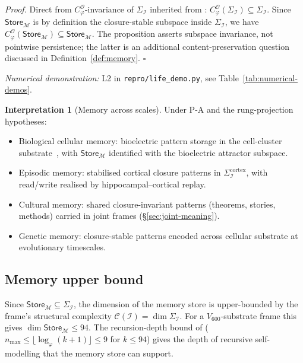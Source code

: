 \documentclass[11pt]{article}
\theoremstyle{plain}
\theoremstyle{definition}
\newtheorem{interpretation}[theorem]{Interpretation}
\theoremstyle{remark}
\newcommand{\Ical}{\mathcal{I}}
\newcommand{\Ocal}{\mathcal{O}}
\newcommand{\Ccal}{\mathcal{C}}
\newcommand{\Mcal}{\mathcal{M}}
\newcommand{\Cph}{C_\varphi}
\begin{document}
\noindent\emph{Proof.} Direct from $\Cph^\Ocal$-invariance of $\Sigma_\Ical$ inherited from \citet{SmartExistenceClosure}: $\Cph^\Ocal(\Sigma_\Ical) \subseteq \Sigma_\Ical$. Since $\mathsf{Store}_\Mcal$ is by definition the closure-stable subspace inside $\Sigma_\Ical$, we have $\Cph^\Ocal(\mathsf{Store}_\Mcal) \subseteq \mathsf{Store}_\Mcal$. The proposition asserts subspace invariance, not pointwise persistence; the latter is an additional content-preservation question discussed in Definition~\ref{def:memory}. \hfill$\square$

\noindent\emph{Numerical demonstration:} L2 in \texttt{repro/life\_demo.py}, see Table~\ref{tab:numerical-demos}.


\begin{interpretation}[Memory across scales]\label{int:memory}
Under P-A and the rung-projection hypotheses:
\begin{itemize}[leftmargin=2em]
\item Biological cellular memory: bioelectric pattern storage in the cell-cluster substrate~\citep{LevinBasalCognition}, with $\mathsf{Store}_\Mcal$ identified with the bioelectric attractor subspace.
\item Episodic memory: stabilised cortical closure patterns in $\Sigma_\Ical^{\mathrm{cortex}}$, with read/write realised by hippocampal--cortical replay.
\item Cultural memory: shared closure-invariant patterns (theorems, stories, methods) carried in joint frames (\S\ref{sec:joint-meaning}).
\item Genetic memory: closure-stable patterns encoded across cellular substrate at evolutionary timescales.
\end{itemize}
\end{interpretation}

\subsection{Memory upper bound}

Since $\mathsf{Store}_\Mcal \subseteq \Sigma_\Ical$, the dimension of the memory store is upper-bounded by the frame's structural complexity $\Ccal(\Ical) = \dim \Sigma_\Ical$. For a $V_{600}$-substrate frame this gives $\dim \mathsf{Store}_\Mcal \leq 94$. The recursion-depth bound of \citet{SmartExistenceClosure} ($n_{\max} \leq \lfloor \log_\varphi (k+1) \rfloor \leq 9$ for $k \leq 94$) gives the depth of recursive self-modelling that the memory store can support.
\end{document}
